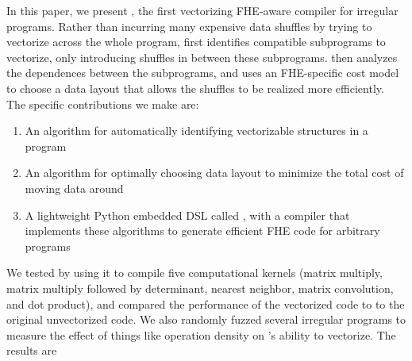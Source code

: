In this paper, we present \system, the first vectorizing FHE-aware compiler for irregular programs.
Rather than incurring many expensive data shuffles by trying to vectorize across the whole program, \system first identifies compatible subprograms to vectorize, only introducing shuffles in between these subprograms.
\system then analyzes the dependences between the subprograms, and uses an FHE-specific cost model to choose a data layout that allows the shuffles to be realized more efficiently.
The specific contributions we make are:
\begin{enumerate}
    \item An algorithm for automatically identifying vectorizable structures in a program
    \item An algorithm for optimally choosing data layout to minimize the total cost of moving data around
    \item A lightweight Python embedded DSL called \system, with a compiler that implements these algorithms to generate efficient FHE code for arbitrary programs
\end{enumerate}

We tested \system by using it to compile five computational kernels (matrix multiply, matrix multiply followed by determinant, nearest neighbor, matrix convolution, and dot product), and compared the performance of the vectorized code to to the original unvectorized code.
We also randomly fuzzed several irregular programs to measure the effect of things like operation density on \system's ability to vectorize. 
The results are 

